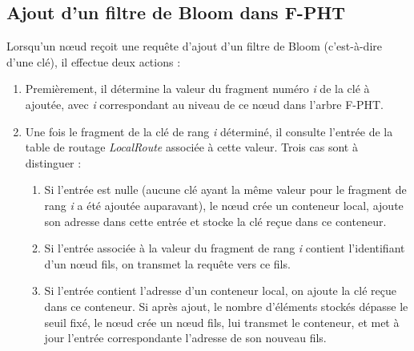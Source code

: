 \documentclass[a4paper,11pt]{report}
\begin{document}
\subsection{Ajout d'un filtre de Bloom dans F-PHT}
	Lorsqu'un nœud reçoit une requête d'ajout d'un filtre de Bloom (c'est-à-dire d'une clé), il effectue deux actions :
	\begin{enumerate}
		\item Premièrement, il détermine la valeur du fragment numéro \textit{i} de la clé à ajoutée, avec \textit{i} correspondant au niveau de ce nœud dans l'arbre F-PHT.
		\item Une fois le fragment de la clé de rang \textit{i} déterminé, il consulte l'entrée de la table de routage \textit{LocalRoute} associée à cette valeur. Trois cas sont à distinguer :
		\begin{enumerate}
			\item Si l'entrée est nulle (aucune clé ayant la même valeur pour le fragment de rang \textit{i} a été ajoutée auparavant), le nœud crée un conteneur local, ajoute son adresse dans cette entrée et stocke la clé reçue dans ce conteneur.
			\item Si l'entrée associée à la valeur du fragment de rang \textit{i} contient l'identifiant d'un nœud fils, on transmet la requête vers ce fils.
			\item Si l'entrée contient l'adresse d'un conteneur local, on ajoute la clé reçue dans ce conteneur. Si après ajout, le nombre d'éléments stockés dépasse le seuil fixé, le nœud crée un nœud fils, lui transmet le conteneur, et met à jour l'entrée correspondante l'adresse de son nouveau fils.
		\end{enumerate}
	\end{enumerate}
		
\end{document}
